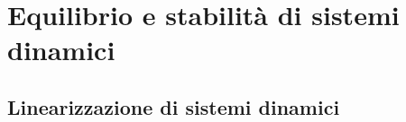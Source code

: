 \documentclass[../main.tex]{subfiles}
\begin{document}
\clearpage
\thispagestyle{empty}
\vspace*{7cm}
\section{Equilibrio e stabilità di sistemi dinamici}
\vspace*{1.5cm}



\subsection{Linearizzazione di sistemi dinamici}
\end{document}
